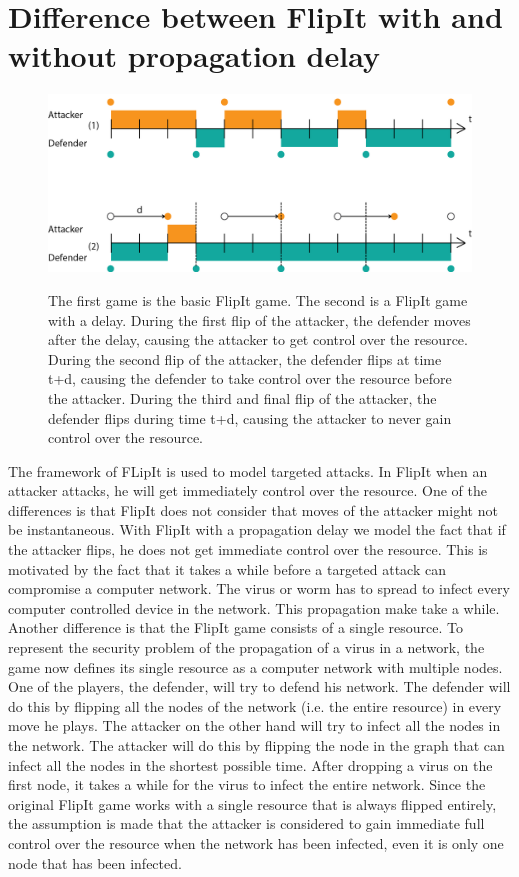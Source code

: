 \section{Difference between FlipIt with and without propagation delay}
\label{ch2:diffFlip}
\begin{figure}[hbtp]
\caption{The first game is the basic FlipIt game. The second is a FlipIt game with a delay. During the first flip of the attacker, the defender moves after the delay, causing the attacker to get control over the resource. During the second flip of the attacker, the defender flips at time t+d, causing the defender to take control over the resource before the attacker. During the third and final flip of the attacker, the defender flips during time t+d, causing the attacker to never gain control over the resource. }
\centering
\includegraphics[scale=0.7]{Images/dtFlip.png}
\label{dt}
\end{figure}

The framework of FLipIt is used to model targeted attacks. In FlipIt when an attacker attacks, he will get immediately control over the resource. One of the differences is that FlipIt does not consider that moves of the attacker might not be instantaneous. With FlipIt with a propagation delay we model the fact that if the attacker flips, he does not get immediate control over the resource.  This is motivated by the fact that it takes a while before a targeted attack can compromise a computer network. The virus or worm has to spread to infect every computer controlled device in the network. This propagation make take a while. \\

Another difference is that the FlipIt game consists of a single resource. To represent the security problem of the propagation of a virus in a network, the game now defines its single resource as a computer network with multiple
nodes. One of the players, the defender, will try to defend his network. The defender
will do this by flipping all the nodes of the network (i.e. the entire resource) in every move he plays. The
attacker on the other hand will try to infect all the nodes in the network. The attacker
will do this by flipping the node in the graph that can infect all the nodes in the
shortest possible time. After dropping a virus on the first node, it takes a while for the virus to infect the entire network. Since the original FlipIt game works with a single resource that is always flipped entirely, the assumption is made that the attacker is considered to gain immediate full control over the resource when the network has been infected, even it is only one node that has been infected.\\

